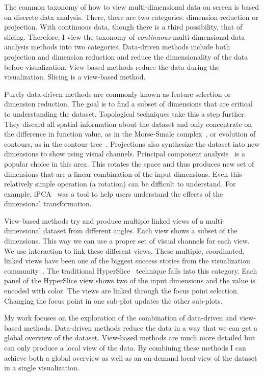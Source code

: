 The common taxonomy of how to view multi-dimensional data on screen is based on
discrete data analysis. There, there are two categories: dimension reduction or
projection. With continuous data, though there is a third possibility, that of
slicing. Therefore, I view the taxonomy of \emph{continuous} multi-dimensional
data analysis methods into two categories. Data-driven methods include both
projection and dimension reduction and reduce the dimensionality of the data
before visualization. View-based methods reduce the data during the
visualization. Slicing is a view-based method.

Purely data-driven methods are commonly known as feature selection or dimension
reduction. The goal is to find a subset of dimensions that are critical to
understanding the dataset. Topological techniques take this a step further.
They discard all spatial information about the dataset and only concentrate on
the difference in function value, as in the Morse-Smale
complex~\cite{Gyulassy:2012a}, or evolution of contours, as in the contour
tree~\cite{Carr:2003a}.  Projections also synthesize the dataset into new
dimensions to show using visual channels. Principal component
analysis~\cite{Holbrey:2006} is a popular choice in this area. This rotates the
space and thus produces new set of dimensions that are a linear combination of
the input dimensions. Even this relatively simple operation (a rotation) can be
difficult to understand. For example, iPCA~\cite{Jeong:2009a} was a tool to
help users understand the effects of the dimensional transformation.

View-based methods try and produce multiple linked views of a multi-dimensional
dataset from different angles. Each view shows a subset of the dimensions.
This way we can use a proper set of visual channels for each view.  We use
interaction to link these different views. These multiple, coordinated, linked
views have been one of the biggest success stories from the visualization
community~\cite{Rao:1994}. The traditional HyperSlice~\cite{Wijk:1993}
technique falls into this category. Each panel of the HyperSlice view shows two
of the input dimensions and the value is encoded with color.
The views are linked through the focus point selection. Changing the focus point
in one sub-plot updates the other sub-plots.

My work focuses on the exploration of the combination of data-driven and
view-based methods.  Data-driven methods reduce the data in a way that we can
get a global overview of the dataset. View-based methods are much more detailed
but can only produce a local view of the data. By combining these methods I can
achieve both a global overview as well as an on-demand local view of the
dataset in a single visualization. 


